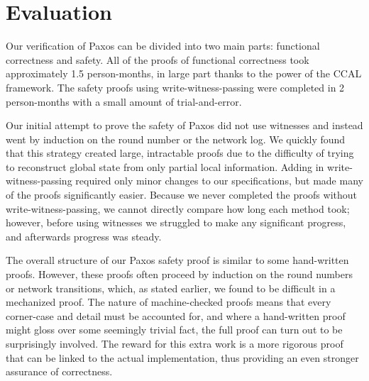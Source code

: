 \section{Evaluation}
\label{sec:evaluation}


Our verification of Paxos can be divided into two main parts: functional correctness and safety.
All of the proofs of functional correctness took approximately 1.5 person-months, in large part thanks to the power of the CCAL framework.
The safety proofs using write-witness-passing were completed in 2 person-months with a small amount of trial-and-error.


Our initial attempt to prove the safety of Paxos did not use witnesses and instead went by induction on the round number or the network log.
We quickly found that this strategy created large, intractable proofs due to the difficulty of trying to reconstruct global state
from only partial local information.
Adding in write-witness-passing required only minor changes to our specifications, but made many of the proofs significantly easier.
Because we never completed the proofs without write-witness-passing, we cannot directly compare how long each method took;
however, before using witnesses we struggled to make any significant progress, and afterwards progress was steady.


The overall structure of our Paxos safety proof is similar to some hand-written proofs.
However, these proofs often proceed by induction on the round numbers or network transitions,
which, as stated earlier, we found to be difficult in a mechanized proof.
The nature of machine-checked proofs means that every corner-case and detail must be accounted for,
and where a hand-written proof might gloss over some seemingly trivial fact, the full proof can turn out
to be surprisingly involved.
The reward for this extra work is a more rigorous proof that can be linked to the actual implementation,
thus providing an even stronger assurance of correctness.
